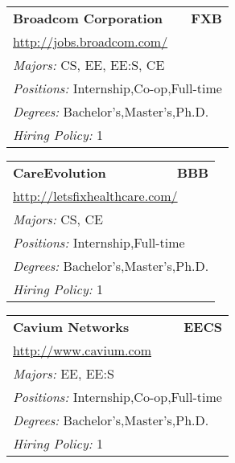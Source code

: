 \documentclass[twoside]{article}
\begin{document}
\begin{center}
\begin{multicols}{3}
\begin{FlushLeft}
\begin{minipage}{.9\columnwidth}
\end{minipage}
 
\begin{minipage}{.9\columnwidth}\begin{tabularx}{.95\columnwidth}{Xr}
                 {\Large\bf Broadcom Corporation} & {\Large\bf FXB}\\
    \multicolumn{2}{p{.95\columnwidth}}{\url{http://jobs.broadcom.com/}}\\
    \multicolumn{2}{p{.95\columnwidth}}{\emph{Majors:} CS, EE, EE:S, CE}\\
    \multicolumn{2}{p{.95\columnwidth}}{\emph{Positions:} Internship,Co-op,Full-time}\\
    \multicolumn{2}{p{.95\columnwidth}}{\emph{Degrees:} Bachelor's,Master's,Ph.D.}\\
    \multicolumn{2}{p{.95\columnwidth}}{\emph{Hiring Policy:} 1}\\
    \end{tabularx}
    
\end{minipage}
 
\begin{minipage}{.9\columnwidth}\begin{tabularx}{.95\columnwidth}{Xr}
                 {\Large\bf CareEvolution} & {\Large\bf BBB}\\
    \multicolumn{2}{p{.95\columnwidth}}{\url{http://letsfixhealthcare.com/}}\\
    \multicolumn{2}{p{.95\columnwidth}}{\emph{Majors:} CS, CE}\\
    \multicolumn{2}{p{.95\columnwidth}}{\emph{Positions:} Internship,Full-time}\\
    \multicolumn{2}{p{.95\columnwidth}}{\emph{Degrees:} Bachelor's,Master's,Ph.D.}\\
    \multicolumn{2}{p{.95\columnwidth}}{\emph{Hiring Policy:} 1}\\
    \end{tabularx}
    
\end{minipage}
 
\begin{minipage}{.9\columnwidth}\begin{tabularx}{.95\columnwidth}{Xr}
                 {\Large\bf Cavium Networks} & {\Large\bf EECS}\\
    \multicolumn{2}{p{.95\columnwidth}}{\url{http://www.cavium.com}}\\
    \multicolumn{2}{p{.95\columnwidth}}{\emph{Majors:} EE, EE:S}\\
    \multicolumn{2}{p{.95\columnwidth}}{\emph{Positions:} Internship,Co-op,Full-time}\\
    \multicolumn{2}{p{.95\columnwidth}}{\emph{Degrees:} Bachelor's,Master's,Ph.D.}\\
    \multicolumn{2}{p{.95\columnwidth}}{\emph{Hiring Policy:} 1}\\
    \end{tabularx}
    

\end{minipage}
\end{FlushLeft}
\end{multicols}
\end{center}
\end{document}
